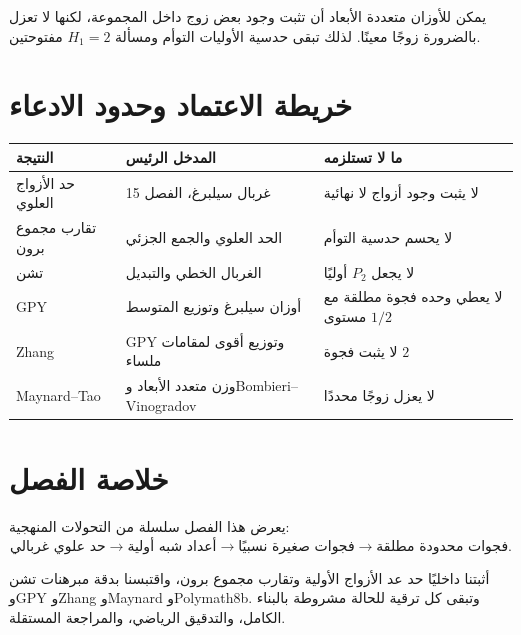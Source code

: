 يمكن للأوزان متعددة الأبعاد أن تثبت وجود بعض زوج داخل المجموعة، لكنها لا تعزل
بالضرورة زوجًا معينًا. لذلك تبقى حدسية الأوليات التوأم ومسألة \(H_1=2\) مفتوحتين.

\section{خريطة الاعتماد وحدود الادعاء}

\begin{center}
\begin{tabular}{p{}p{}p{}}
\textbf{النتيجة} & \textbf{المدخل الرئيس} & \textbf{ما لا تستلزمه} \\
\hline
حد الأزواج العلوي & غربال سيلبرغ، الفصل 15 & لا يثبت وجود أزواج لا نهائية \\
تقارب مجموع برون & الحد العلوي والجمع الجزئي & لا يحسم حدسية التوأم \\
تشن & الغربال الخطي والتبديل & لا يجعل \(P_2\) أوليًا \\
GPY & أوزان سيلبرغ وتوزيع المتوسط & لا يعطي وحده فجوة مطلقة مع مستوى \(1/2\) \\
Zhang & GPY وتوزيع أقوى لمقامات ملساء & لا يثبت فجوة \(2\) \\
Maynard--Tao & وزن متعدد الأبعاد وBombieri--Vinogradov & لا يعزل زوجًا محددًا \\
\end{tabular}
\end{center}

\section{خلاصة الفصل}

يعرض هذا الفصل سلسلة من التحولات المنهجية:
\[
 \text{حد علوي غربالي}
 \longrightarrow
 \text{أعداد شبه أولية}
 \longrightarrow
 \text{فجوات صغيرة نسبيًا}
 \longrightarrow
 \text{فجوات محدودة مطلقة}.
\]

أثبتنا داخليًا حد عد الأزواج الأولية وتقارب مجموع برون، واقتبسنا بدقة مبرهنات
تشن وGPY وZhang وMaynard وPolymath8b. وتبقى كل ترقية للحالة مشروطة بالبناء
الكامل، والتدقيق الرياضي، والمراجعة المستقلة.
